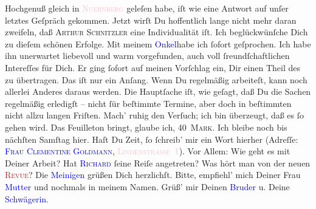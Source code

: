                Hochgenuß gleich in \textsc{\textcolor{pink}{Nuernberg}{}\ledrightnote{\textcolor{pink}{Nürnberg}}} geleſen habe, iſt  wie eine
               Antwort auf unſer letztes Geſpräch gekommen. Jetzt wirſt Du hoffentlich lange nicht
               mehr daran zweifeln, daß \textsc{Arthur Schnitzler} eine
               Individualität iſt. Ich beglückwünſche Dich zu dieſem schönen Erfolge.\pend
           \pstart
           Mit  meinem \textcolor{blue}{Onkel}{}habe ich ſofort geſprochen. Ich habe ihn unerwartet
               liebevoll und warm vorgefunden, auch voll ſreundſchaftlichen Intereſſes für Dich. Er
               ging ſofort auf meinen Vorſchlag ein, Dir einen Theil des \label{K_L02612-2v}\label{K_L02612-2h} zu übertragen. Das iſt nur ein Anſang. Wenn Du regelmäßig arbeiteſt,
               kann noch {\pb}allerlei Anderes daraus werden. Die
               Hauptſache iſt, wie geſagt, daß Du die Sachen regelmäßig erledigſt – nicht ſür
               beſtimmte Termine, aber doch in beſtimmten nicht allzu langen Friſten. Mach’ ruhig
               den Verſuch; ich bin überzeugt, daß es ſo gehen wird. Das Feuilleton bringt, {\pb}glaube ich, \textsc{40 Mark}.\pend
           \pstart
           Ich bleibe noch bis nächſten Samſtag hier. Haſt Du
               Zeit, ſo ſchreib’ mir ein Wort hierher (Adreſſe: \textsc{\textcolor{blue}{Frau Clementine Goldmann}{}\ledrightnote{\textcolor{blue}{Clementine Goldmann}}}, \textsc{\textcolor{pink}{Lindenstraße 1}{}\ledrightnote{\textcolor{pink}{Lindenstraße}}}). Vor
               Allem: Wie geht es mit Deiner Arbeit? Hat \textsc{\textcolor{blue}{Richard}{}\ledrightnote{\textcolor{blue}{Richard Beer-Hofmann}}}{ }{\pb} ſeine Reiſe angetreten? Was hört man von der neuen
                  \textsc{\textcolor{brown}{Revue}{}}?\pend
           \pstart
           Die \textcolor{blue}{Meinigen}{}
               grüßen Dich herzlichſt. Bitte, empfiehl’ mich Deiner Frau \textcolor{blue}{Mutter}{} und \label{K_L02612-11v}\label{K_L02612-11h} nochmals in meinem Namen. Grüß’ mir Deinen \textcolor{blue}{Bruder}{} u. Deine \textcolor{blue}{Schwägerin}{}.\pend
